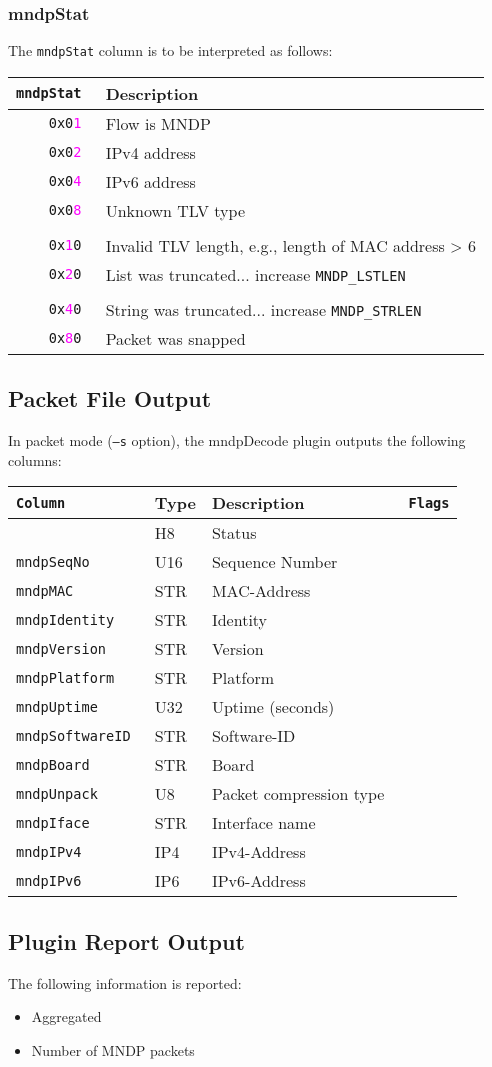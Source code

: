 \documentclass[documentation]{subfiles}
\begin{document}
\subsubsection{mndpStat}\label{mndpStat}
The {\tt mndpStat} column is to be interpreted as follows:
\begin{longtable}{>{\tt}rl}
    \toprule
    {\bf mndpStat} & {\bf Description}\\
    \midrule\endhead%
    0x0\textcolor{magenta}{1} & Flow is MNDP\\
    0x0\textcolor{magenta}{2} & IPv4 address\\
    0x0\textcolor{magenta}{4} & IPv6 address\\
    0x0\textcolor{magenta}{8} & Unknown TLV type\\
    \\
    0x\textcolor{magenta}{1}0 & Invalid TLV length, e.g., length of MAC address > 6\\
    0x\textcolor{magenta}{2}0 & List was truncated... increase {\tt MNDP\_LSTLEN}\\\\
    0x\textcolor{magenta}{4}0 & String was truncated... increase {\tt MNDP\_STRLEN}\\
    0x\textcolor{magenta}{8}0 & Packet was snapped\\
    \bottomrule
\end{longtable}

\subsection{Packet File Output}
In packet mode ({\tt --s} option), the mndpDecode plugin outputs the following columns:
\begin{longtable}{>{\tt}lll>{\tt\small}l}
    \toprule
    {\bf Column}       & {\bf Type} & {\bf Description} & {\bf Flags}\\
    \midrule\endhead%
    \nameref{mndpStat} & H8  & Status\\
    mndpSeqNo          & U16 & Sequence Number\\
    mndpMAC            & STR & MAC-Address\\
    mndpIdentity       & STR & Identity\\
    mndpVersion        & STR & Version\\
    mndpPlatform       & STR & Platform\\
    mndpUptime         & U32 & Uptime (seconds)\\
    mndpSoftwareID     & STR & Software-ID\\
    mndpBoard          & STR & Board\\
    mndpUnpack         & U8  & Packet compression type\\
    mndpIface          & STR & Interface name\\
    mndpIPv4           & IP4 & IPv4-Address\\
    mndpIPv6           & IP6 & IPv6-Address\\
    \bottomrule
\end{longtable}

\subsection{Plugin Report Output}
The following information is reported:
\begin{itemize}
    \item Aggregated {\tt{}}
    \item Number of MNDP packets
\end{itemize}
\end{document}
